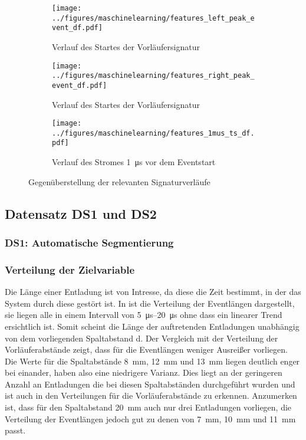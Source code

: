 \begin{figure}[H]
    \centering
    \begin{subfigure}[b]{0.32\linewidth}
        \texttt{[image: ../figures/maschinelearning/features\_left\_peak\_event\_df.pdf]}
        \caption{Verlauf des Startes der Vorläufersignatur}
        \label{fig:event_left_current_sliece}
    \end{subfigure}
    \hfill
    \begin{subfigure}[b]{0.32\linewidth}
        \texttt{[image: ../figures/maschinelearning/features\_right\_peak\_event\_df.pdf]}
        \caption{Verlauf des Startes der Vorläufersignatur}
        \label{fig:event-right-current_sliece}
    \end{subfigure}
    \hfill
    \begin{subfigure}[b]{0.32\linewidth}
        \texttt{[image: ../figures/maschinelearning/features\_1mus\_ts\_df.pdf]}
        \caption{Verlauf des Stromes \SI{1}{\micro\second} vor dem Eventstart}
        \label{fig:1mus-current-sliece}
    \end{subfigure}
    \caption{Gegenüberstellung der relevanten Signaturverläufe}
    \label{fig:all-event-slices}
\end{figure}

\subsection{Datensatz DS1 und DS2}

\subsubsection{DS1: Automatische Segmentierung}

\subsubsection{Verteilung der Zielvariable}
Die Länge einer Entladung ist von Intresse, da diese die Zeit bestimmt, in der das System durch diese gestört ist. In  ist die Verteilung der Eventlängen dargestellt, sie liegen alle in einem Intervall von \SIrange{5}{20}{\micro\second} ohne dass ein linearer Trend ersichtlich ist. Somit scheint die Länge der auftretenden Entladungen unabhängig von dem vorliegenden Spaltabstand d. Der Vergleich mit der Verteilung der Vorläuferabstände zeigt, dass für die Eventlängen weniger Ausreißer vorliegen. Die Werte für die Spaltabstände \SI{8}{\milli\meter}, \SI{12}{\milli\meter} und \SI{13}{\milli\meter} liegen deutlich enger bei einander, haben also eine niedrigere Varianz. Dies liegt an der geringeren Anzahl an Entladungen die bei diesen Spaltabständen durchgeführt wurden und ist auch in den Verteilungen für die Vorläuferabstände zu erkennen. Anzumerken ist, dass für den Spaltabstand \SI{20}{\milli\meter} auch nur drei Entladungen vorliegen, die Verteilung der Eventlängen jedoch gut zu denen von \SI{7}{\milli\meter}, \SI{10}{\milli\meter} und \SI{11}{\milli\meter} passt.


